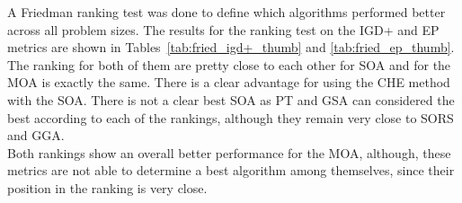 A Friedman ranking test was done to define which algorithms performed better across all problem sizes. The results for the ranking test on the IGD+ and EP metrics are shown in Tables~\ref{tab:fried_igd+_thumb} and \ref{tab:fried_ep_thumb}. The ranking for both of them are pretty close to each other for SOA and for the MOA is exactly the same. There is a clear advantage for using the CHE method with the SOA. There is not a clear best SOA as PT and GSA can considered the best according to each of the rankings, although they remain very close to SORS and GGA. \\ 

Both rankings show an overall better performance for the MOA, although, these metrics are not able to determine a best algorithm among themselves, since their position in the ranking is very close.\\

